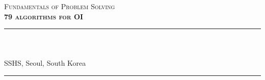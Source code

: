 
\begin{titlepage}
    \colorbox{black!5}{
        \parbox[t]{0.975\textwidth}{%
            \parbox[t]{0.95\textwidth}{%
                \raggedleft\vspace{0.75cm}\Huge\scshape
                Fundamentals of Problem Solving \\[7.5pt]
                \large\bf 79 algorithms for OI
                \vspace{0.75cm}
            }
        }
    }

    \vfill

    \parbox[t]{0.95\textwidth}{%
        \hfill\rule{0.15\linewidth}{0.5pt}\\[7.5pt]
        \raggedleft
        \textcopyright{}\\[4pt]
        
        \normalsize\textsuperscript{\textdagger} SSHS, Seoul, South Korea\\

        \hfill\rule{0.15\linewidth}{0.5pt}
    }
\end{titlepage}
